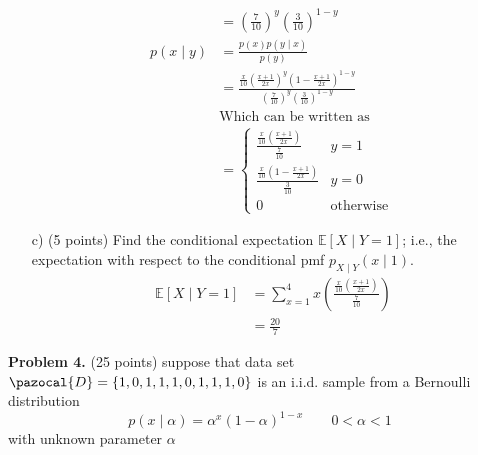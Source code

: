 \documentclass[a4 paper]{article}
\begin{document}
\begin{enumerate}
\begin{equation*}
\begin{split}
			& = \left(\frac{7}{10}\right)^y\left(\frac{3}{10}\right)^{1-y}	\\
			p(x \mid y) & = \frac{p(x)p(y\mid x)}{p(y)}	\\
			& = \frac{\frac{x}{10}\left(\frac{x+1}{2x}\right)^y\left(1 - \frac{x+1}{2x}\right)^{1-y}}{\left(\frac{7}{10}\right)^y\left(\frac{3}{10}\right)^{1-y}} \\ 
			& \text{Which can be written as} \\
			& = \begin{cases} \frac{\frac{x}{10}\left(\frac{x+1}{2x}\right)}{\frac{7}{10}} & y=1 \\
	 \frac{\frac{x}{10}\left(1-\frac{x+1}{2x}\right)}{\frac{3}{10}}& y=0 \\
	 0 & \text{otherwise}
	\end{cases}
			\end{split}
		\end{equation*}
		\item[c) (5 points)] Find the conditional expectation $\mathbb{E}[X \mid Y=1]$; i.e., the expectation with respect to the conditional pmf $p_{X\mid Y}(x\mid 1)$.
		\begin{equation*}				
		\begin{split}\
		\mathbb{E}[X \mid Y=1] & = \sum_{x=1}^4 x\left(\frac{\frac{x}{10}\left(\frac{x+1}{2x}\right)}{\frac{7}{10}}\right) \\
		& = \frac{20}{7}
		\end{split}
		\end{equation*}
	\end{enumerate}
	\textbf{Problem 4.} (25 points) suppose that data set $\pazocal{D} = \{1, 0, 1, 1, 1, 0, 1, 1, 1, 0\} $ is an i.i.d. sample from a Bernoulli distribution
	\begin{equation*}
	p(x \mid \alpha) = \alpha^x(1-\alpha)^{1-x} \qquad 0 < \alpha <1
	\end{equation*}
	with unknown parameter $\alpha$
\end{document}

